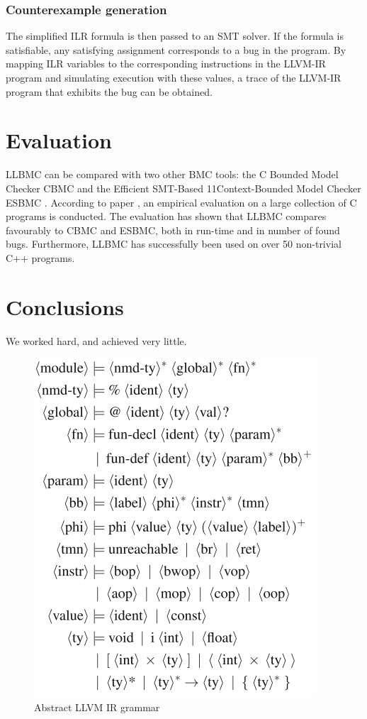 \documentclass[14pt]{article}
\begin{document}
  
  \subsubsection{Counterexample generation}\label{Counterexample generation} The simplified ILR formula is then passed to an SMT solver. If the formula is satisfiable, any satisfying assignment corresponds to a bug in the program. By mapping ILR variables to the corresponding instructions in the LLVM-IR program and simulating execution with these values, a trace of the LLVM-IR program that exhibits the bug can be obtained. 
  
  
\section{Evaluation}\label{Evaluation}
LLBMC can be compared with two other BMC tools: the C Bounded Model Checker CBMC  \cite{CBMC} and the Efficient SMT-Based
11Context-Bounded Model Checker ESBMC  \cite{ESBMC}. According to paper \cite{llbmc0},  an empirical evaluation on a large collection of C programs is conducted.  The evaluation has shown that LLBMC compares favourably to CBMC and ESBMC, both in run-time and in number of found bugs. Furthermore, LLBMC has successfully been used on over 50 non-trivial C++ programs. 
  
 \section{Conclusions}\label{conclusions}
We worked hard, and achieved very little.
  
\begin{figure}[htb!]
  \begin{centering}
    \includegraphics[scale=0.5]{figures/llvm_ir_grammar}\par
  \end{centering}
  \caption{Abstract LLVM IR grammar}
  \label{fig:llvm_ir_grammar}
\end{figure}
\end{document}
